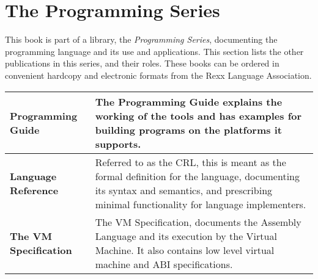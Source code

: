 \chapter{The \crexx{} Programming Series}
This book is part of a library, the \emph{\crexx{} Programming Series}, documenting the \crexx{} programming language and its use and applications. This section lists the other publications in this series, and their roles. These books can be ordered in convenient hardcopy and electronic formats from the Rexx Language Association.
\newline
\newline
\begin{tabularx}{\textwidth}{>{\bfseries}lX}
\toprule
Programming Guide & The Programming Guide
explains the working of the tools and has examples for building
programs on the platforms it supports.
\\\midrule
Language Reference & Referred to as the CRL, this is meant as the formal definition for the language, documenting its syntax and semantics, and prescribing minimal functionality for language implementers.
\\\midrule
The \crexx{} VM Specification & The \crexx{} VM
Specification, documents the \crexx{} Assembly Language and its execution
by the \crexx{} Virtual Machine. It also contains low level virtual
machine and ABI specifications.
\\\bottomrule
\end{tabularx}
